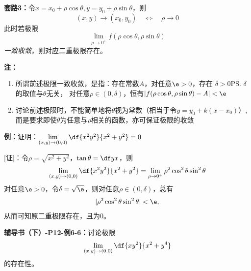 {\bf 套路3：}令$x=x_0+\rho\cos\theta,y=y_0+\rho\sin\theta$，则
$$(x,y)\to(x_0,y_0)\quad\Leftrightarrow\quad\rho\to0$$
此时若极限
$$\lim\limits_{\rho\to{0^+}}f(\rho\cos\theta,\rho\sin\theta)$$
{\it 一致收敛}，则对应二重极限存在。

{\bf 注：}
\begin{enumerate}[(1)]
  \setlength{\itemindent}{1cm}
  \item 所谓前述极限一致收敛，是指：存在常数$A$，对任意$\e>0$，存在
  $\delta>0$\ps{$\delta$的取值与$\theta$无关}，
  对任意$\rho\in(0,\delta)$，恒有$|f(\rho\cos\theta,\rho\sin\theta)-A|<\e$
  \item 讨论前述极限时，不能简单地将$\theta$视为常数（相当于令$y=y_0+k(x-x_0)$）,
  而是要求即使$\theta$为任意与$\rho$相关的函数，亦可保证极限的收敛
\end{enumerate}

{\bf 例：}证明：$\lim\limits_{(x,y)\to(0,0)}\df{x^2y^2}{x^2+y^2}=0$
	
[证]：令$\rho=\sqrt{x^2+y^2}$，$\tan\theta=\df yx$，则	
$$\lim\limits_{(x,y)\to(0,0)}\df{x^2y^2}{x^2+y^2}
=\lim\limits_{\rho\to{0^+}}\rho^2\cos^2\theta\sin^2\theta$$
对任意$\e>0$，令$\delta=\sqrt{\e}$，则对任意$\rho\in(0,\delta)$，总有
$$|\rho^2\cos^2\theta\sin^2\theta|<\e,$$
从而可知原二重极限存在，且为$0$。

{\bf 辅导书（下）-P12-例6-6：}讨论极限
$$\lim\limits_{(x,y)\to(0,0)}\df{xy^2}{x^2+y^4}$$
的存在性。

